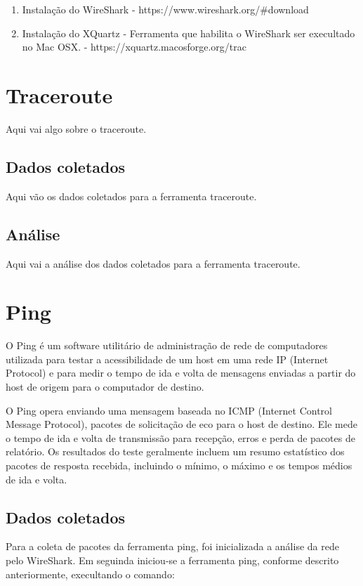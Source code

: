 \documentclass[a4paper]{report} %
\begin{document}
\begin{enumerate}
    \item Instalação do WireShark - https://www.wireshark.org/#download
    \item Instalação do XQuartz - Ferramenta que habilita o WireShark ser execultado no Mac OSX. - https://xquartz.macosforge.org/trac
\end{enumerate}


\section{Traceroute}
\label{sec_traceroute}
Aqui vai algo sobre o traceroute.
\subsection{Dados coletados}
\label{sub_traceroute_dados}
Aqui vão os dados coletados para a ferramenta traceroute.

\subsection{Análise}
\label{sub_traceroute_analise}
Aqui vai a análise dos dados coletados para a ferramenta traceroute.

\section{Ping}
\label{sec_ping}
O Ping é um software utilitário de administração de rede de computadores utilizada para testar a acessibilidade de um host em uma rede IP (Internet Protocol) e para medir o tempo de ida e volta de mensagens enviadas a partir do host de origem para o computador de destino.

O Ping opera enviando uma mensagem baseada no ICMP (Internet Control Message Protocol), pacotes de solicitação de eco para o host de destino. Ele mede o tempo de ida e volta de transmissão para recepção, erros e perda de pacotes de relatório. Os resultados do teste geralmente incluem um resumo estatístico dos pacotes de resposta recebida, incluindo o mínimo, o máximo e os tempos médios de ida e volta.

\subsection{Dados coletados}
\label{sub_ping_dados}
Para a coleta de pacotes da ferramenta ping, foi inicializada a análise da rede pelo WireShark. Em seguinda iniciou-se a ferramenta ping, conforme descrito anteriormente, execultando o comando:
\end{document}
